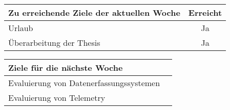 \begin{tabularx}{\textwidth}{Xc}
    \arrayrulecolor{OliveGreen}
    \toprule
    {\bfseries Zu erreichende Ziele der aktuellen Woche} & {\bfseries Erreicht} \\
    \midrule[2pt]
    Urlaub                                               &Ja                    \\
    \rowcolor{OliveGreen!15}
    Überarbeitung der Thesis                             &Ja                    \\
    \bottomrule[2pt]
\end{tabularx}
%
\vspace{1cm}
%
\begin{tabularx}{\textwidth}{Xc}
    \arrayrulecolor{OliveGreen}
    \toprule
    {\bfseries Ziele für die nächste Woche}              &                      \\
    \midrule[2pt]
    Evaluierung von Datenerfassungssystemen              &                      \\
    \rowcolor{OliveGreen!15}
    Evaluierung von Telemetry                            &                      \\
\end{tabularx}
